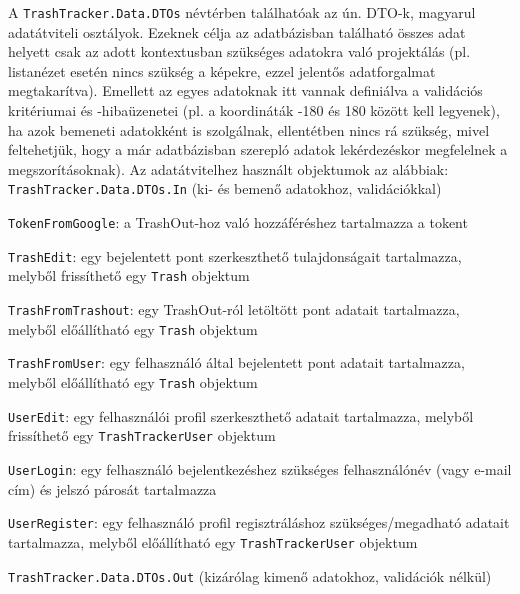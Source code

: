 A \texttt{TrashTracker.Data.DTOs} névtérben találhatóak az ún. DTO-k, magyarul adatátviteli osztályok. Ezeknek célja az adatbázisban található összes adat helyett csak az adott kontextusban szükséges adatokra való projektálás (pl. listanézet esetén nincs szükség a képekre, ezzel jelentős adatforgalmat megtakarítva). Emellett az egyes adatoknak itt vannak definiálva a validációs kritériumai és -hibaüzenetei (pl. a koordináták -180 és 180 között kell legyenek), ha azok bemeneti adatokként is szolgálnak, ellentétben nincs rá szükség, mivel feltehetjük, hogy a már adatbázisban szerepló adatok lekérdezéskor megfelelnek a megszorításoknak). Az adatátvitelhez használt objektumok az alábbiak:\\
\texttt{TrashTracker.Data.DTOs.In} (ki- és bemenő adatokhoz, validációkkal)
\begin{compactitem}
	\item \texttt{TokenFromGoogle}: a TrashOut-hoz való hozzáféréshez tartalmazza a tokent
	\item \texttt{TrashEdit}: egy bejelentett pont szerkeszthető tulajdonságait tartalmazza, melyből frissíthető egy \texttt{Trash} objektum
	\item \texttt{TrashFromTrashout}: egy TrashOut-ról letöltött pont adatait tartalmazza, melyből előállítható egy \texttt{Trash} objektum
	\item \texttt{TrashFromUser}: egy felhasználó által bejelentett pont adatait tartalmazza, melyből előállítható egy \texttt{Trash} objektum
	\item \texttt{UserEdit}: egy felhasználói profil szerkeszthető adatait tartalmazza, melyből frissíthető egy \texttt{TrashTrackerUser} objektum
	\item \texttt{UserLogin}: egy felhasználó bejelentkezéshez szükséges felhasználónév (vagy e-mail cím) és jelszó párosát tartalmazza
	\item \texttt{UserRegister}: egy felhasználó profil regisztráláshoz szükséges/megadható adatait tartalmazza, melyből előállítható egy \texttt{TrashTrackerUser} objektum
\end{compactitem}
\texttt{TrashTracker.Data.DTOs.Out} (kizárólag kimenő adatokhoz, validációk nélkül)
